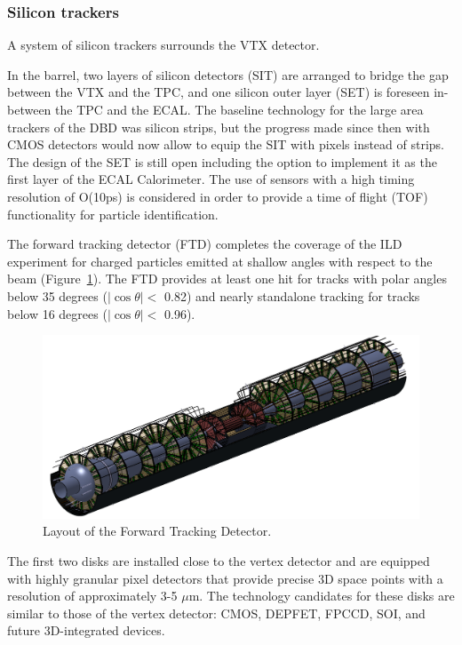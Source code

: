 \vspace{1cm}
\subsubsection*{\bf Silicon trackers}

A system of silicon trackers surrounds the VTX detector. 

In the barrel, two layers of silicon detectors (SIT) are arranged to bridge the gap between the VTX and the TPC, and one silicon outer layer (SET) is foreseen in-between the TPC and the ECAL. The baseline technology for the large area trackers of the DBD was silicon strips, but the progress made since then with CMOS detectors would now allow to equip the SIT with pixels instead of strips. The design of the SET is still open including the option to implement it as the first layer of the ECAL Calorimeter. The use of sensors with a high timing resolution of O(10ps) is considered in order to provide a time of flight (TOF) functionality  for particle identification. 

The forward tracking detector (FTD) completes the coverage of the ILD experiment for charged particles emitted at shallow angles with respect to the beam (Figure~\ref{fig:det:FTD}). The FTD provides at least one hit for tracks with polar angles below 35 degrees ($|\cos \theta| < $ 0.82) and nearly standalone tracking for tracks below 16 degrees ($|\cos \theta| <$ 0.96).

\begin{figure}[t!]
\centering
\includegraphics[width=0.75\hsize]{Detector/fig/FTD.png}
\caption{Layout of the Forward Tracking Detector.}
\label{fig:det:FTD}
\end{figure}

The first two disks are installed close to the vertex detector and are equipped with highly granular pixel detectors that provide precise 3D space points with a resolution of approximately 3-5 $\mu\mathrm{m}$. The technology candidates for these disks are similar to those of the vertex detector: CMOS, DEPFET, FPCCD, SOI, and future 3D-integrated devices. 


